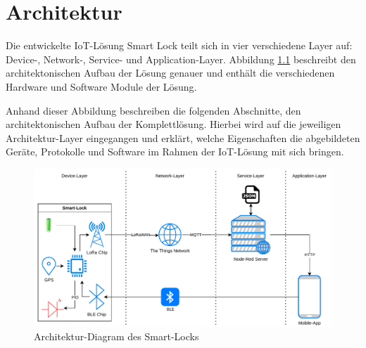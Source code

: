 
\chapter{Architektur}
Die entwickelte \ac{IoT}-Lösung Smart Lock teilt sich in vier verschiedene Layer auf: Device-, Network-, Service- und Application-Layer. Abbildung \ref{fig:architektur} beschreibt den architektonischen Aufbau der Lösung genauer und enthält die verschiedenen Hardware und Software Module der Lösung. 

Anhand dieser Abbildung beschreiben die folgenden Abschnitte, den architektonischen Aufbau der Komplettlösung. Hierbei wird auf die jeweiligen Architektur-Layer eingegangen und erklärt, welche Eigenschaften die abgebildeten Geräte, Protokolle und Software im Rahmen der \ac{IoT}-Lösung mit sich bringen.

\begin{figure}[!htbp]
    \centering
    \includegraphics[width=1\linewidth]{images/architecture_smart_lock.pdf}
    \caption[Architektur-Diagram des Smart-Locks]{Architektur-Diagram des Smart-Locks}
    \label{fig:architektur}
\end{figure}




